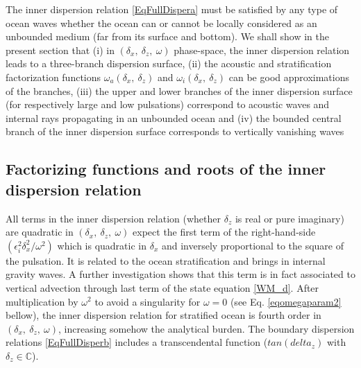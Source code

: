 \documentclass[a4paper,11pt]{article}
\begin{document}
The inner dispersion relation \ref{EqFullDispera} must be satisfied by any type of ocean waves whether the ocean can or cannot be locally considered as an unbounded medium (far from its surface and bottom). We shall show in the present section that (i) in $(\delta_x,\  \delta_z,\ \omega)$ phase-space, the inner dispersion relation leads to a three-branch dispersion surface, (ii) the acoustic and stratification factorization functions $\omega_a(\delta_x,\ \delta_z)$ and $\omega_i(\delta_x,\ \delta_z)$ can be good approximations of the branches, (iii) the upper and lower branches of the inner dispersion surface (for respectively large and low pulsations) correspond to acoustic waves and internal rays propagating in an unbounded ocean and (iv) the bounded central branch of the inner dispersion surface corresponds to vertically vanishing waves


\subsection{Factorizing functions and roots of the inner dispersion relation}
\label{SubSectionFactoDisp}

All terms in the inner dispersion relation (whether $\delta_z$ is real or pure imaginary) are quadratic in $(\delta_x,\ \delta_z,\ \omega)$ expect the first term of the right-hand-side $(\epsilon_i^2 \delta_x^2/\omega^2)$ which is quadratic in $\delta_x$ and inversely proportional to the square of the pulsation. It is related to the ocean stratification and brings in internal gravity waves. A further investigation shows that this term is in fact associated to vertical advection through last term of the state equation \ref{WM_d}. After multiplication by $\omega^2$ to avoid a singularity for $\omega = 0$ (see Eq. \ref{eqomegaparam2} bellow), the inner dispersion relation for stratified ocean is fourth order in $(\delta_x,\ \delta_z,\ \omega)$, increasing somehow the analytical burden. The boundary dispersion relations \ref{EqFullDisperb} includes a transcendental function ($tan(delta_z)$ with $\delta_z\in\mathbb{C}$).
\end{document}
